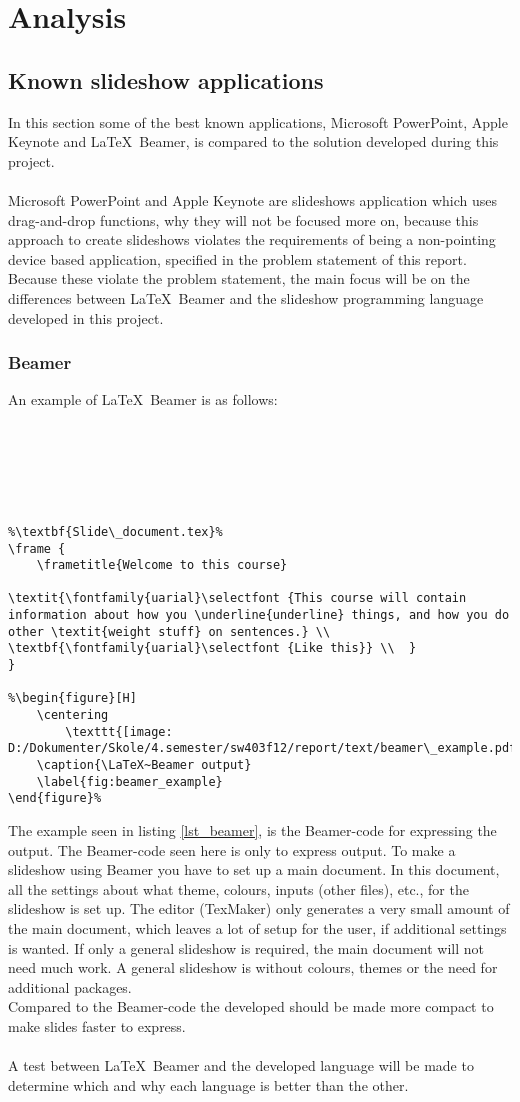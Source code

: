 \part{Analysis}
\chapter{Known slideshow applications}
In this section some of the best known applications, Microsoft PowerPoint, Apple Keynote and \LaTeX~Beamer, is compared to the solution developed during this project.
\\ \\
Microsoft PowerPoint and Apple Keynote are slideshows application which uses drag-and-drop functions, why they will not be focused more on, because this approach to create slideshows violates the requirements of being a non-pointing device based application, specified in the problem statement of this report. Because these violate the problem statement, the main focus will be on the differences between \LaTeX~Beamer and the slideshow programming language developed in this project.
\section{Beamer}
An example of \LaTeX~Beamer is as follows:

\begin{lstlisting}[frame=single, caption={Beamer example}, label=lst_beamer]
%\textbf{Main\_document.tex}%






%\textbf{Slide\_document.tex}%
\frame {
	\frametitle{Welcome to this course}

\textit{\fontfamily{uarial}\selectfont {This course will contain information about how you \underline{underline} things, and how you do other \textit{weight stuff} on sentences.} \\
\textbf{\fontfamily{uarial}\selectfont {Like this}} \\	}
}

%\begin{figure}[H]
	\centering
		\texttt{[image: D:/Dokumenter/Skole/4.semester/sw403f12/report/text/beamer\_example.pdf]}
	\caption{\LaTeX~Beamer output}
	\label{fig:beamer_example}
\end{figure}%

\end{lstlisting}

The example seen in listing \ref{lst_beamer}, is the Beamer-code for expressing the output. The Beamer-code seen here is only to express output. To make a slideshow using Beamer you have to set up a main document. In this document, all the settings about what theme, colours, inputs (other files), etc., for the slideshow is set up. The editor (TexMaker) only generates a very small amount of the main document, which leaves a lot of setup for the user, if additional settings is wanted. If only a general slideshow is required, the main document will not need much work. A general slideshow is without colours, themes or the need for additional packages.\\

Compared to the Beamer-code the developed should be made more compact to make slides faster to express.
\\ \\
A test between \LaTeX~Beamer and the developed language will be made to determine which and why each language is better than the other.